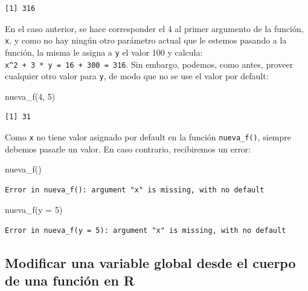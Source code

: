 \documentclass[
]{book}
\newenvironment{Shaded}{\begin{snugshade}}{\end{snugshade}}
\newcommand{\AttributeTok}[1]{\textcolor[rgb]{0.77,0.63,0.00}{#1}}
\newcommand{\DecValTok}[1]{\textcolor[rgb]{0.00,0.00,0.81}{#1}}
\newcommand{\FunctionTok}[1]{\textcolor[rgb]{0.00,0.00,0.00}{#1}}
\newcommand{\NormalTok}[1]{#1}
\begin{document}
\begin{verbatim}
[1] 316
\end{verbatim}

En el caso anterior, se hace corresponder el 4 al primer argumento de la función, \texttt{x}, y como no hay ningún otro parámetro actual que le estemos pasando a la función, la misma le asigna a \texttt{y} el valor 100 y calcula: \texttt{x\^{}2\ +\ 3\ *\ y\ =\ 16\ +\ 300\ =\ 316}. Sin embargo, podemos, como antes, proveer cualquier otro valor para \texttt{y}, de modo que no se use el valor por default:

\begin{Shaded}
\begin{Highlighting}[]
\FunctionTok{nueva\_f}\NormalTok{(}\DecValTok{4}\NormalTok{, }\DecValTok{5}\NormalTok{)}
\end{Highlighting}
\end{Shaded}

\begin{verbatim}
[1] 31
\end{verbatim}

Como \texttt{x} no tiene valor asignado por default en la función \texttt{nueva\_f()}, siempre debemos pasarle un valor. En caso contrario, recibiremos un error:

\begin{Shaded}
\begin{Highlighting}[]
\FunctionTok{nueva\_f}\NormalTok{()}
\end{Highlighting}
\end{Shaded}

\begin{verbatim}
Error in nueva_f(): argument "x" is missing, with no default
\end{verbatim}

\begin{Shaded}
\begin{Highlighting}[]
\FunctionTok{nueva\_f}\NormalTok{(}\AttributeTok{y =} \DecValTok{5}\NormalTok{)}
\end{Highlighting}
\end{Shaded}

\begin{verbatim}
Error in nueva_f(y = 5): argument "x" is missing, with no default
\end{verbatim}

\hypertarget{modificar-una-variable-global-desde-el-cuerpo-de-una-funciuxf3n-en-r}{%
\subsection{Modificar una variable global desde el cuerpo de una función en R}\label{modificar-una-variable-global-desde-el-cuerpo-de-una-funciuxf3n-en-r}}
\end{document}
